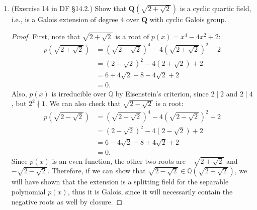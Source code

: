 \documentclass[10pt]{article}
\newcommand{\Q}{\mathbb{Q}}
\begin{document}
\begin{enumerate}
\begin{proof}
$F_1$ is the splitting field for the polynomial $x^2 - 2$ over $\Q$.  $F_2$ is the splitting field for the polynomial $x^2 - \sqrt{2}$ over $F_1$.  $F_3$ is the splitting field for the polynomial $x^4 - 2$ over $\Q$, $F_1$, and $F_2$.  Thus, $F_i / F_j$ is Galois for every $i > j$ other than $(i,j) = (2,0)$.

However, $F_2 / \Q$ is not Galois.  Since $F_2$ contains a root of the irreducible polynomial $x^4 - 2$, if it were Galois then it would contain all the roots.  However, it does not contain the root $i\sqrt[4]{2}$.

\end{proof}

\item (Exercise 14 in DF \S 14.2.) Show that $\mathbf{Q}(\sqrt{2+\sqrt{2}})$ is a cyclic quartic field, i.e., is a Galois extension of degree $4$ over $\mathbf{Q}$ with cyclic Galois group.

\begin{proof}

First, note that $\sqrt{2 + \sqrt{2}}$ is a root of $p(x) = x^4 - 4x^2 + 2$:
\begin{align*}
p \left( \sqrt{2 + \sqrt{2}} \right) &= \left( \sqrt{2 + \sqrt{2}} \right) ^4 - 4 \left( \sqrt{2 + \sqrt{2}} \right) ^2 + 2
\\
&= \left(2 + \sqrt{2} \right)^2 - 4 \left(2 + \sqrt{2} \right) + 2
\\
&= 6 + 4\sqrt{2} - 8 - 4\sqrt{2} + 2
\\
&= 0.
\end{align*}
Also, $p(x)$ is irreducible over $\Q$ by Eisenstein's criterion, since $2 \mid 2$ and $2 \mid 4$, but $2^2 \nmid 1$.  We can also check that $\sqrt{2 - \sqrt{2}}$ is a root:
\begin{align*}
p \left( \sqrt{2 - \sqrt{2}} \right) &= \left( \sqrt{2 - \sqrt{2}} \right) ^4 - 4 \left( \sqrt{2 - \sqrt{2}} \right) ^2 + 2
\\
&= \left(2 - \sqrt{2} \right)^2 - 4 \left(2 - \sqrt{2} \right) + 2
\\
&= 6 - 4\sqrt{2} - 8 + 4\sqrt{2} + 2
\\
&= 0.
\end{align*}
Since $p(x)$ is an even function, the other two roots are $-\sqrt{2 + \sqrt{2}}$ and $-\sqrt{2 - \sqrt{2}}$.  Therefore, if we can show that $\sqrt{2 - \sqrt{2}} \in \Q(\sqrt{2 + \sqrt{2}})$, we will have shown that the extension is a splitting field for the separable polynomial $p(x)$, thus it is Galois, since it will necessarily contain the negative roots as well by closure.


\end{proof}
\end{enumerate}
\end{document}
